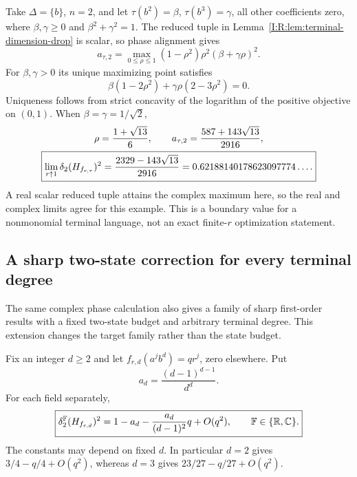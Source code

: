 Take $\Delta=\{b\}$, $n=2$, and let
$\tau(b^2)=\beta$, $\tau(b^3)=\gamma$, all other coefficients zero,
where $\beta,\gamma\ge0$ and $\beta^2+\gamma^2=1$.
The reduced tuple in Lemma~\ref{I:R:lem:terminal-dimension-drop} is scalar,
so phase alignment gives
\[
 a_{\tau,2}=\max_{0\le\rho\le1}
          (1-\rho^2)\rho^2(\beta+\gamma\rho)^2.
\]
For $\beta,\gamma>0$ its unique maximizing point satisfies
\[
 \beta(1-2\rho^2)+\gamma\rho(2-3\rho^2)=0.
\]
Uniqueness follows from strict concavity of the logarithm of the
positive objective on $(0,1)$.  When
$\beta=\gamma=1/\sqrt2$,
\begin{gather}
 \rho=\frac{1+\sqrt{13}}6,\qquad
 a_{\tau,2}=\frac{587+143\sqrt{13}}{2916},\notag\\
 \boxed{\displaystyle
 \lim_{r\uparrow1}\delta_2(H_{f_{r,\tau}})^2
 =\frac{2329-143\sqrt{13}}{2916}
 =0.62188140178623097774\ldots .}
 \label{I:R:eq:terminal-mixed-example}
\end{gather}
A real scalar reduced tuple attains the complex maximum here, so the
real and complex limits agree for this example.  This is a boundary
value for a nonmonomial terminal language, not an exact finite-$r$
optimization statement.

\subsection{A sharp two-state correction for every terminal degree}
\label{I:R:subsec:all-terminal-degrees}

The same complex phase calculation also gives a family of sharp
first-order results with a fixed two-state budget and arbitrary
terminal degree.  This extension changes the target family rather than
the state budget.

\begin{theorem}
\label{I:R:thm:two-state-all-degrees}
Fix an integer $d\ge2$ and let
$f_{r,d}(a^j b^d)=qr^j$, zero elsewhere.  Put
\[
 a_d=\frac{(d-1)^{d-1}}{d^d}.
\]
For each field separately,
\begin{equation}
 \boxed{\displaystyle
 \delta_2^{\mathbb F}(H_{f_{r,d}})^2
   =1-a_d-\frac{a_d}{(d-1)^2}q+O(q^2),
 \qquad\mathbb F\in\{\mathbb R,\mathbb C\}.}
 \label{I:R:eq:two-state-all-degrees}
\end{equation}
The constants may depend on fixed $d$.  In particular $d=2$ gives
$3/4-q/4+O(q^2)$, whereas $d=3$ gives
$23/27-q/27+O(q^2)$.
\end{theorem}


